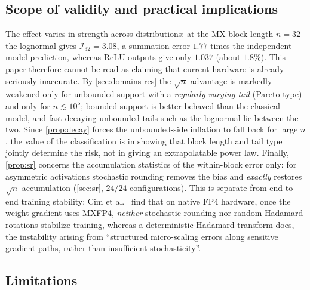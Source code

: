 \documentclass[review,hidelinks,oneeqnum,onetabnum,onefignum,onethmnum]{siamart251216}
\begin{document}
\subsection{Scope of validity and practical implications}

The effect varies in strength across distributions: at the MX block length $n=32$
the lognormal gives $\mathcal I_{32}=3.08$, a summation error $1.77$ times the
independent-model prediction, whereas ReLU outputs give only $1.037$ (about
$1.8\%$). This paper therefore cannot be read as claiming that current hardware is
already seriously inaccurate. By \cref{sec:domains-res} the $\sqrt n$ advantage is
markedly weakened only for unbounded support with a \emph{regularly varying tail}
(Pareto type) and only for $n\lesssim10^5$; bounded support is better behaved than
the classical model, and fast-decaying unbounded tails such as the lognormal lie
between the two. Since \cref{prop:decay} forces the unbounded-side inflation to
fall back for large $n$, the value of the classification is in showing that block
length and tail type jointly determine the risk, not in giving an extrapolatable
power law. Finally, \cref{prop:sr} concerns the accumulation statistics of the
within-block error only: for asymmetric activations stochastic rounding removes the
bias and \emph{exactly} restores $\sqrt n$ accumulation (\cref{sec:sr}, $24/24$
configurations). This is separate from end-to-end training stability: Cim et
al.\ \cite{cim2026mxfp4} find that on native FP4 hardware, once the weight gradient
uses MXFP4, \emph{neither} stochastic rounding nor random Hadamard rotations
stabilize training, whereas a deterministic Hadamard transform does, the
instability arising from ``structured micro-scaling errors along sensitive gradient
paths, rather than insufficient stochasticity''.

\subsection{Limitations}
\label{sec:limitations}
\end{document}
